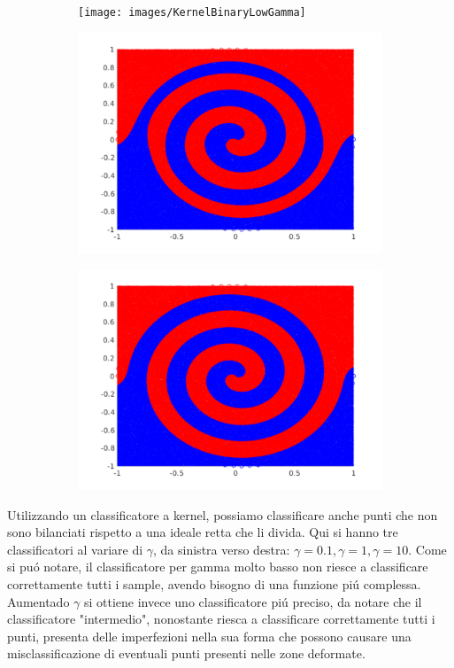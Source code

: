 \documentclass[12pt]{article}
\begin{document}
\begin{figure}[H]
  \centering
  \begin{subfigure}{0.30\textwidth}
    \texttt{[image: images/KernelBinaryLowGamma]}
  \end{subfigure}
  \begin{subfigure}{0.30\textwidth}
    \includegraphics[width=\textwidth]{images/KernelBinaryMidGamma}
  \end{subfigure}
  \begin{subfigure}{0.30\textwidth}
    \includegraphics[width=\textwidth]{images/KernelBinaryHighGamma}
  \end{subfigure}
\end{figure}
Utilizzando un classificatore a kernel, possiamo classificare anche punti che non sono
bilanciati rispetto a una ideale retta che li divida.
Qui si hanno tre classificatori al variare di $\gamma$, da sinistra verso destra:
$\gamma = 0.1, \gamma = 1, \gamma = 10$.
Come si puó notare, il classificatore per gamma molto basso non riesce a classificare
correttamente tutti i sample, avendo bisogno di una funzione piú complessa.
Aumentado $\gamma$ si ottiene invece uno classificatore piú preciso, da notare che
il classificatore "intermedio", nonostante riesca a classificare correttamente tutti i punti,
presenta delle imperfezioni nella sua forma che possono causare una misclassificazione di eventuali
punti presenti nelle zone deformate.
\end{document}
